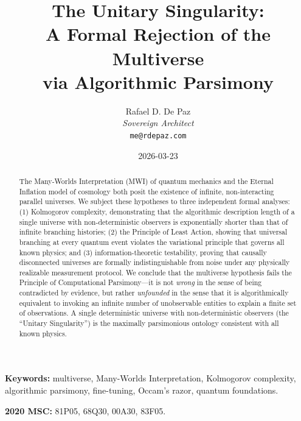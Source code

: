\documentclass[12pt, a4paper]{article}
\theoremstyle{plain}
\theoremstyle{definition}
\begin{document}
\title{\textbf{
  The Unitary Singularity: \\
  A Formal Rejection of the Multiverse \\
  via Algorithmic Parsimony}}
\author{Rafael D. De Paz \\ \textit{Sovereign Architect} \\ \texttt{me@rdepaz.com}}
\date{2026-03-23}
\maketitle

\begin{abstract}
The Many-Worlds Interpretation (MWI) of quantum mechanics and the Eternal
Inflation model of cosmology both posit the existence of infinite,
non-interacting parallel universes. We subject these hypotheses to three
independent formal analyses: (1) Kolmogorov complexity, demonstrating that
the algorithmic description length of a single universe with non-deterministic
observers is exponentially shorter than that of infinite branching histories;
(2) the Principle of Least Action, showing that universal branching at every
quantum event violates the variational principle that governs all known
physics; and (3) information-theoretic testability, proving that causally
disconnected universes are formally indistinguishable from noise under any
physically realizable measurement protocol. We conclude that the multiverse
hypothesis fails the Principle of Computational Parsimony---it is not
\emph{wrong} in the sense of being contradicted by evidence, but rather
\emph{unfounded} in the sense that it is algorithmically equivalent to
invoking an infinite number of unobservable entities to explain a finite
set of observations. A single deterministic universe with non-deterministic
observers (the ``Unitary Singularity'') is the maximally parsimonious
ontology consistent with all known physics.
\end{abstract}

\vspace{1em}
\noindent\textbf{Keywords:} multiverse, Many-Worlds Interpretation,
Kolmogorov complexity, algorithmic parsimony, fine-tuning,
Occam's razor, quantum foundations.

\vspace{0.5em}
\noindent\textbf{2020 MSC:} 81P05, 68Q30, 00A30, 83F05.

\end{document}
